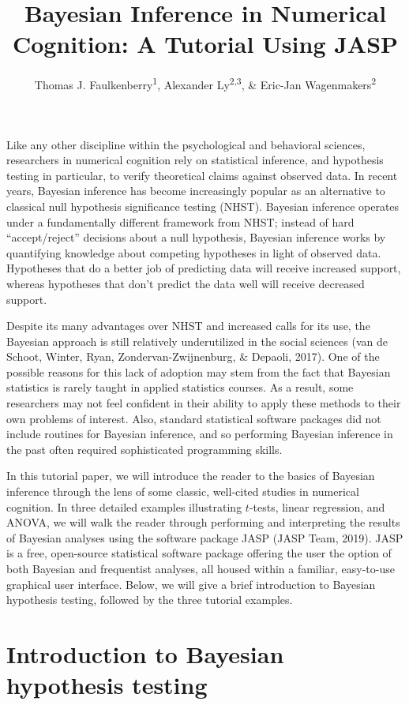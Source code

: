 \documentclass[english,,doc,floatsintext]{apa6}
\title{Bayesian Inference in Numerical Cognition: A Tutorial Using JASP}
\author{Thomas J. Faulkenberry\textsuperscript{1}, Alexander Ly\textsuperscript{2,3}, \& Eric-Jan Wagenmakers\textsuperscript{2}}
\date{}
\affiliation{
\vspace{0.5cm}
\textsuperscript{1} Tarleton State University\\\textsuperscript{2} University of Amsterdam\\\textsuperscript{3} Centrum Wiskunde \& Informatica}
\begin{document}
\maketitle

Like any other discipline within the psychological and behavioral sciences, researchers in numerical cognition rely on statistical inference, and hypothesis testing in particular, to verify theoretical claims against observed data. In recent years, Bayesian inference has become increasingly popular as an alternative to classical null hypothesis significance testing (NHST). Bayesian inference operates under a fundamentally different framework from NHST; instead of hard \enquote{accept/reject} decisions about a null hypothesis, Bayesian inference works by quantifying knowledge about competing hypotheses in light of observed data. Hypotheses that do a better job of predicting data will receive increased support, whereas hypotheses that don't predict the data well will receive decreased support.

Despite its many advantages over NHST and increased calls for its use, the Bayesian approach is still relatively underutilized in the social sciences (van de Schoot, Winter, Ryan, Zondervan-Zwijnenburg, \& Depaoli, 2017). One of the possible reasons for this lack of adoption may stem from the fact that Bayesian statistics is rarely taught in applied statistics courses. As a result, some researchers may not feel confident in their ability to apply these methods to their own problems of interest. Also, standard statistical software packages did not include routines for Bayesian inference, and so performing Bayesian inference in the past often required sophisticated programming skills.

In this tutorial paper, we will introduce the reader to the basics of Bayesian inference through the lens of some classic, well-cited studies in numerical cognition. In three detailed examples illustrating \(t\)-tests, linear regression, and ANOVA, we will walk the reader through performing and interpreting the results of Bayesian analyses using the software package JASP (JASP Team, 2019). JASP is a free, open-source statistical software package offering the user the option of both Bayesian and frequentist analyses, all housed within a familiar, easy-to-use graphical user interface. Below, we will give a brief introduction to Bayesian hypothesis testing, followed by the three tutorial examples.

\hypertarget{introduction-to-bayesian-hypothesis-testing}{%
\section{Introduction to Bayesian hypothesis testing}\label{introduction-to-bayesian-hypothesis-testing}}
\end{document}
